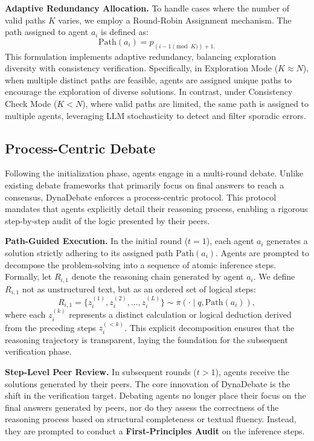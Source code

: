 \textbf{Adaptive Redundancy Allocation.}
To handle cases where the number of valid paths $K$ varies, we employ a Round-Robin Assignment mechanism. The path assigned to agent $a_i$ is defined as:
\begin{equation}
    \text{Path}(a_i) = p_{(i-1 \pmod K) + 1.}
\end{equation}
This formulation implements adaptive redundancy, balancing exploration diversity with consistency verification.
Specifically, in Exploration Mode ($K \approx N$), when multiple distinct paths are feasible, agents are assigned unique paths to encourage the exploration of diverse solutions.
In contrast, under Consistency Check Mode ($K < N$), where valid paths are limited, the same path is assigned to multiple agents, leveraging LLM stochasticity to detect and filter sporadic errors.

\subsection{Process-Centric Debate}
\label{sec:debate}

Following the initialization phase, agents engage in a multi-round debate. Unlike existing debate frameworks that primarily focus on final answers to reach a consensus, DynaDebate enforces a process-centric protocol. This protocol mandates that agents explicitly detail their reasoning process, enabling a rigorous step-by-step audit of the logic presented by their peers.

\textbf{Path-Guided Execution.}
In the initial round ($t=1$), each agent $a_i$ generates a solution strictly adhering to its assigned path $\text{Path}(a_i)$. Agents are prompted to decompose the problem-solving into a sequence of atomic inference steps. Formally, let $R_{i,1}$ denote the reasoning chain generated by agent $a_i$. We define $R_{i,1}$ not as unstructured text, but as an ordered set of logical steps:
\begin{equation}
    R_{i,1} = \{z_i^{(1)}, z_i^{(2)}, \dots, z_i^{(L)}\} \sim \pi( \cdot \mid q, \text{Path}(a_i)),
\end{equation}
where each $z_i^{(k)}$ represents a distinct calculation or logical deduction derived from the preceding steps $z_i^{(<k)}$. This explicit decomposition ensures that the reasoning trajectory is transparent, laying the foundation for the subsequent verification phase.

\textbf{Step-Level Peer Review.}
In subsequent rounds ($t>1$), agents receive the solutions generated by their peers. The core innovation of DynaDebate is the shift in the verification target. Debating agents no longer place their focus on the final answers generated by peers, nor do they assess the correctness of the reasoning process based on structural completeness or textual fluency. Instead, they are prompted to conduct a \textbf{First-Principles Audit} on the inference steps.

